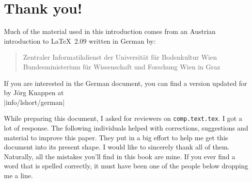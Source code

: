 \chapter{Thank you!}
\noindent Much of the material used in this introduction comes from an
Austrian introduction to \LaTeX\ 2.09 written in German by:
\begin{verse}
%
{Zentraler Informatikdienst der Universit\"at f\"ur Bodenkultur Wien}
%
   {Bundesministerium f\"ur Wissenschaft und Forschung Wien}
%
   {in Graz}
\end{verse}

If you are interested in the German document, you can find a version
updated for \LaTeXe{} by J\"org Knappen at\\
\CTAN|info/lshort/german|

\newpage
\noindent While preparing this document, I asked
for reviewers on \texttt{comp.text.tex}. I got a lot of response. The
following individuals helped with corrections, suggestions and
material to improve this paper. They put in a big effort to help me
get this document into its present shape. I would like to
sincerely thank all of them. Naturally, all the mistakes you'll find
in this book are mine. If you ever find a word that is spelled
correctly, it must have been one of the people below dropping me a
line.

